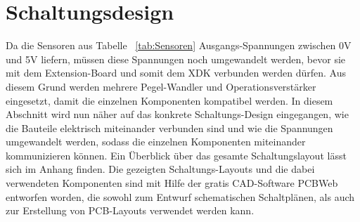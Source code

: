 \section{Schaltungsdesign}\label{sec:Schaltungsdesign}
Da die Sensoren aus Tabelle ~\ref{tab:Sensoren} Ausgangs-Spannungen zwischen 0V und 5V liefern, müssen diese Spannungen noch umgewandelt werden, bevor sie mit dem Extension-Board und somit dem XDK verbunden werden dürfen. Aus diesem Grund werden mehrere Pegel-Wandler und Operationsverstärker eingesetzt, damit die einzelnen Komponenten kompatibel werden.
\newline
In diesem Abschnitt wird nun näher auf das konkrete Schaltungs-Design eingegangen, wie die Bauteile elektrisch miteinander verbunden sind und wie die Spannungen umgewandelt werden, sodass die einzelnen Komponenten miteinander kommunizieren können. Ein Überblick über das gesamte Schaltungslayout lässt sich im Anhang finden.
\newline
Die gezeigten Schaltungs-Layouts und die dabei verwendeten Komponenten sind mit Hilfe der gratis \acf{CAD}-Software PCBWeb entworfen worden, die sowohl zum Entwurf schematischen Schaltplänen, als auch zur Erstellung von \acf{PCB}-Layouts verwendet werden kann.

